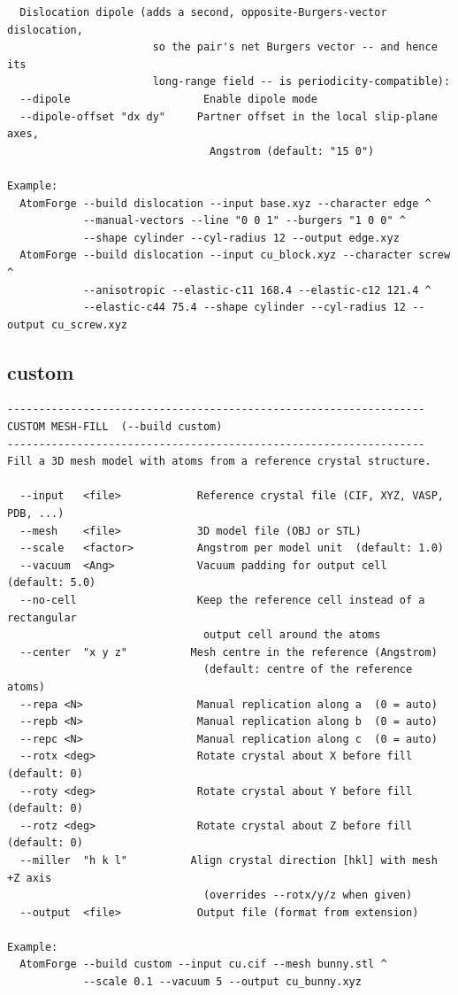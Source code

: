 \begin{lstlisting}
  Dislocation dipole (adds a second, opposite-Burgers-vector dislocation,
                       so the pair's net Burgers vector -- and hence its
                       long-range field -- is periodicity-compatible):
  --dipole                     Enable dipole mode
  --dipole-offset "dx dy"     Partner offset in the local slip-plane axes,
                                Angstrom (default: "15 0")

Example:
  AtomForge --build dislocation --input base.xyz --character edge ^
            --manual-vectors --line "0 0 1" --burgers "1 0 0" ^
            --shape cylinder --cyl-radius 12 --output edge.xyz
  AtomForge --build dislocation --input cu_block.xyz --character screw ^
            --anisotropic --elastic-c11 168.4 --elastic-c12 121.4 ^
            --elastic-c44 75.4 --shape cylinder --cyl-radius 12 --output cu_screw.xyz
\end{lstlisting}

\clearpage

\subsection{custom}

\begin{lstlisting}
------------------------------------------------------------------
CUSTOM MESH-FILL  (--build custom)
------------------------------------------------------------------
Fill a 3D mesh model with atoms from a reference crystal structure.

  --input   <file>            Reference crystal file (CIF, XYZ, VASP, PDB, ...)
  --mesh    <file>            3D model file (OBJ or STL)
  --scale   <factor>          Angstrom per model unit  (default: 1.0)
  --vacuum  <Ang>             Vacuum padding for output cell  (default: 5.0)
  --no-cell                   Keep the reference cell instead of a rectangular
                               output cell around the atoms
  --center  "x y z"          Mesh centre in the reference (Angstrom)
                               (default: centre of the reference atoms)
  --repa <N>                  Manual replication along a  (0 = auto)
  --repb <N>                  Manual replication along b  (0 = auto)
  --repc <N>                  Manual replication along c  (0 = auto)
  --rotx <deg>                Rotate crystal about X before fill  (default: 0)
  --roty <deg>                Rotate crystal about Y before fill  (default: 0)
  --rotz <deg>                Rotate crystal about Z before fill  (default: 0)
  --miller  "h k l"          Align crystal direction [hkl] with mesh +Z axis
                               (overrides --rotx/y/z when given)
  --output  <file>            Output file (format from extension)

Example:
  AtomForge --build custom --input cu.cif --mesh bunny.stl ^
            --scale 0.1 --vacuum 5 --output cu_bunny.xyz
\end{lstlisting}

